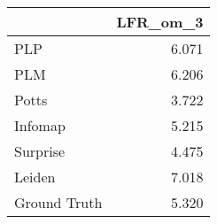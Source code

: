 \begin{tabular}{lr}
\toprule
{} & LFR_om_3 \\
\midrule
PLP          &    6.071 \\
PLM          &    6.206 \\
Potts        &    3.722 \\
Infomap      &    5.215 \\
Surprise     &    4.475 \\
Leiden       &    7.018 \\
Ground Truth &    5.320 \\
\bottomrule
\end{tabular}
